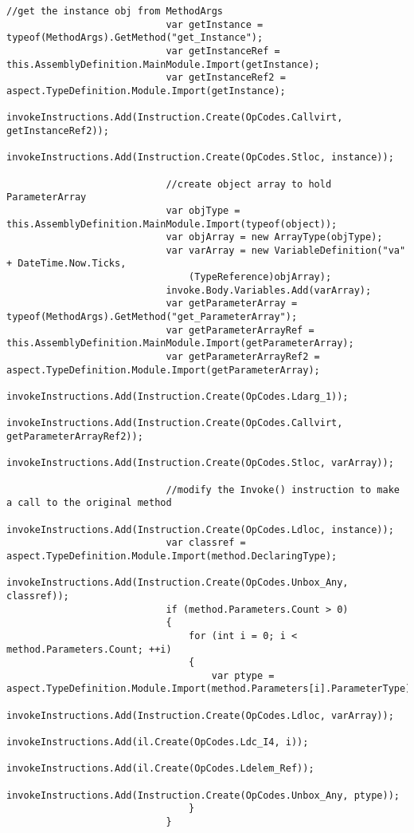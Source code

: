 \begin{lstlisting}[caption={../buffalo/Injectors/MethodAroundInjector.cs}, label=../buffalo/Injectors/MethodAroundInjector.cs, frame=tb, basicstyle=\scriptsize]
                            //get the instance obj from MethodArgs
                            var getInstance = typeof(MethodArgs).GetMethod("get_Instance");
                            var getInstanceRef = this.AssemblyDefinition.MainModule.Import(getInstance);
                            var getInstanceRef2 = aspect.TypeDefinition.Module.Import(getInstance);
                            invokeInstructions.Add(Instruction.Create(OpCodes.Callvirt, getInstanceRef2));
                            invokeInstructions.Add(Instruction.Create(OpCodes.Stloc, instance));

                            //create object array to hold ParameterArray
                            var objType = this.AssemblyDefinition.MainModule.Import(typeof(object));
                            var objArray = new ArrayType(objType);
                            var varArray = new VariableDefinition("va" + DateTime.Now.Ticks,
                                (TypeReference)objArray);
                            invoke.Body.Variables.Add(varArray);
                            var getParameterArray = typeof(MethodArgs).GetMethod("get_ParameterArray");
                            var getParameterArrayRef = this.AssemblyDefinition.MainModule.Import(getParameterArray);
                            var getParameterArrayRef2 = aspect.TypeDefinition.Module.Import(getParameterArray);
                            invokeInstructions.Add(Instruction.Create(OpCodes.Ldarg_1));
                            invokeInstructions.Add(Instruction.Create(OpCodes.Callvirt, getParameterArrayRef2));
                            invokeInstructions.Add(Instruction.Create(OpCodes.Stloc, varArray));

                            //modify the Invoke() instruction to make a call to the original method
                            invokeInstructions.Add(Instruction.Create(OpCodes.Ldloc, instance));
                            var classref = aspect.TypeDefinition.Module.Import(method.DeclaringType);
                            invokeInstructions.Add(Instruction.Create(OpCodes.Unbox_Any, classref));
                            if (method.Parameters.Count > 0)
                            {
                                for (int i = 0; i < method.Parameters.Count; ++i)
                                {
                                    var ptype = aspect.TypeDefinition.Module.Import(method.Parameters[i].ParameterType);
                                    invokeInstructions.Add(Instruction.Create(OpCodes.Ldloc, varArray));
                                    invokeInstructions.Add(il.Create(OpCodes.Ldc_I4, i));
                                    invokeInstructions.Add(il.Create(OpCodes.Ldelem_Ref));
                                    invokeInstructions.Add(Instruction.Create(OpCodes.Unbox_Any, ptype));
                                }
                            }


\end{lstlisting}
